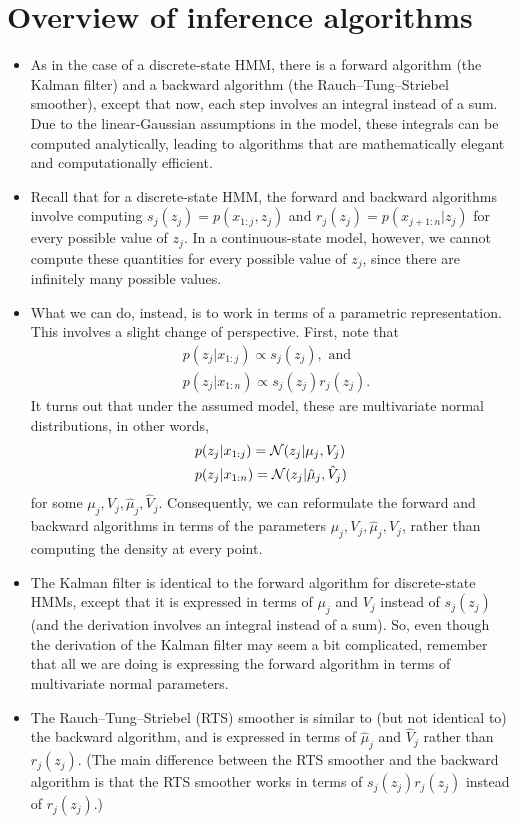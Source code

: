 \documentclass[12pt]{article}
\begin{document}
\section{Overview of inference algorithms}

\begin{itemize}
\item As in the case of a discrete-state HMM, there is a forward algorithm (the Kalman filter) and a backward algorithm (the Rauch--Tung--Striebel smoother), except that now, each step involves an integral instead of a sum. Due to the linear-Gaussian assumptions in the model, these integrals can be computed analytically, leading to algorithms that are mathematically elegant and computationally efficient.
\item Recall that for a discrete-state HMM, the forward and backward algorithms involve computing $s_j(z_j) = p(x_{1:j},z_j)$ and $r_j(z_j) = p(x_{j +1:n} | z_j)$ for every possible value of $z_j$. In a continuous-state model, however, we cannot compute these quantities for every possible value of $z_j$, since there are infinitely many possible values.
\item What we can do, instead, is to work in terms of a parametric representation. This involves a slight change of perspective. First, note that 
\begin{align*}
& p(z_j | x_{1:j}) \propto s_j(z_j), \text{ and}\\
& p(z_j | x_{1:n}) \propto s_j(z_j) r_j(z_j).
\end{align*}
It turns out that under the assumed model, these are multivariate normal distributions, in other words,
\begin{align*}
& p(z_j | x_{1:j}) = \mathcal{N}(z_j | \mu_j,V_j)\\
& p(z_j | x_{1:n}) = \mathcal{N}(z_j | \hat\mu_j,\hat V_j)
\end{align*}
for some $\mu_j,V_j,\hat\mu_j,\hat V_j$. Consequently, we can reformulate the forward and backward algorithms in terms of the parameters $\mu_j,V_j,\hat\mu_j,\hat V_j$, rather than computing the density at every point. 
\item The Kalman filter is identical to the forward algorithm for discrete-state HMMs, except that it is expressed in terms of $\mu_j$ and $V_j$ instead of $s_j(z_j)$ (and the derivation involves an integral instead of a sum). So, even though the derivation of the Kalman filter may seem a bit complicated, remember that all we are doing is expressing the forward algorithm in terms of multivariate normal parameters.
\item The Rauch--Tung--Striebel (RTS) smoother is similar to (but not identical to) the backward algorithm, and is expressed in terms of $\hat\mu_j$ and $\hat V_j$ rather than $r_j(z_j)$. (The main difference between the RTS smoother and the backward algorithm is that the RTS smoother works in terms of $s_j(z_j) r_j(z_j)$ instead of $r_j(z_j)$.)
\end{itemize}
\end{document}
